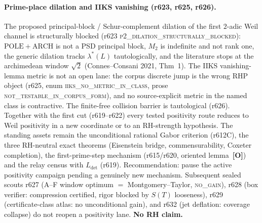 \documentclass[11pt]{article}
\newcommand{\mO}{\textcolor{openred}{\textbf{[O]}}}
\theoremstyle{definition}
\theoremstyle{remark}
\begin{document}
\paragraph{Prime-place dilation and IIKS vanishing (r623, r625, r626).}
The proposed principal-block / Schur-complement dilation of the
first $2$-adic Weil channel is structurally blocked (r623
\textsc{p2\_dilation\_structurally\_blocked}):
$\mathrm{POLE}+\mathrm{ARCH}$ is not a PSD principal block,
$M_2$ is indefinite and not rank one, the generic dilation
tracks $\lambda^*(L)$ tautologically, and the literature stops
at the archimedean window $\sqrt{2}$
(Connes--Consani 2021, Thm~1).  The IIKS vanishing-lemma metric
is not an open lane: the corpus discrete jump is the wrong RHP
object (r625, enum \textsc{iiks\_no\_metric\_in\_class}, prose
\textsc{not\_testable\_in\_corpus\_form}), and no
source-explicit metric in the named class is contractive.  The
finite-free collision barrier is tautological (r626).  Together
with the first cut (r619--r622) every tested positivity route
reduces to Weil positivity in a new coordinate or to an
RH-strength hypothesis.  The standing assets remain the
unconditional rational Gabor criterion (r612C), the three
RH-neutral exact theorems (Eisenstein bridge, commensurability,
Coxeter completion), the first-prime-step mechanism (r615/r620,
oriented lemma~\mO) and the relay census with $L_{\mathrm{det}}$
(r619).  Recommendation: pause the active positivity campaign
pending a genuinely new mechanism.  Subsequent sealed scouts
r627 (A--F window optimum $=$ Montgomery--Taylor, \textsc{no\_gain}),
r628 (box verifier: compression certified, rigor blocked by
$S(T)$ looseness), r629 (certificate-class atlas: no
unconditional gain), and r632 (jet deflation: coverage collapse)
do not reopen a positivity lane.
\textbf{No RH claim.}
\end{document}
